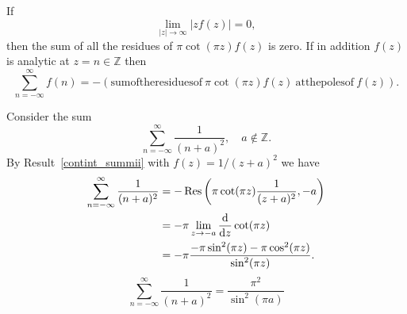 \begin{Result}
  \label{contint_summii}
  If
  \[
  \lim_{|z| \to \infty} \left| z f(z) \right| = 0,
  \]
  then the sum of all the residues of $\pi \cot(\pi z) f(z)$ is zero.  If 
  in addition $f(z)$ is analytic at $z = n \in \mathbb{Z}$ then
  \[
  \sum_{n = -\infty}^\infty f(n) = -( \mathrm{sum of the residues of}\ 
    \pi \cot(\pi z) f(z)\ \mathrm{at the poles of}\ f(z) ).
  \]
\end{Result}



\begin{Example}
  Consider the sum
  \[
  \sum_{n = -\infty}^\infty \frac{1}{(n+a)^2}, \quad a \not\in \mathbb{Z}.
  \]
  By Result~\ref{contint_summii} with $f(z) = 1/(z+a)^2$ we have
  \begin{align*}
    \sum_{n = -\infty}^\infty \frac{1}{(n+a)^2}
    &= - \mathop{\mathrm{Res}}\nolimits \left( \pi \cot(\pi z) \frac{1}{(z+a)^2}, -a \right) \\
    &= - \pi \lim_{z \to -a} \frac{\mathrm{d}}{\mathrm{d} z} \cot(\pi z) \\
    &= - \pi \frac{-\pi \sin^2(\pi z) - \pi \cos^2(\pi z)}
    {\sin^2(\pi z)}. 
  \end{align*}
  \[
  \boxed{
    \sum_{n = -\infty}^\infty \frac{1}{(n+a)^2} = \frac{ \pi^2 }{ \sin^2 (\pi a) }
    }
  \]
\end{Example}










